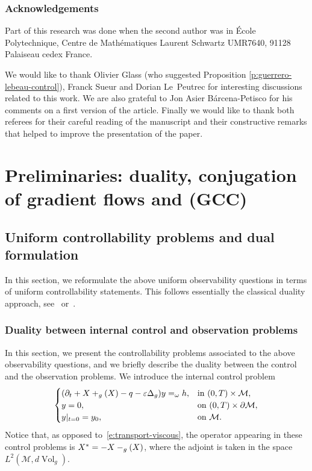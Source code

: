 \documentclass[11pt]{article}
\makeatletter
\numberwithin{equation}{section}
\newcommand{\pGCC}{\textup{(GCC)}\xspace}
\DeclareRobustCommand{\mathds}[1]{\csname jepbb@#1\endcsname}
\theoremstyle{definition}
\newcommand{\M}{\ensuremath{\mathcal M}}
\DeclareMathOperator{\Vol}{Vol}
\let \div \relax
\DeclareMathOperator{\div}{div}
\let\d\partial
\let\eps\varepsilon
\let\q q
\makeatother
\begin{document}
\subsubsection*{Acknowledgements}
Part of this research was done when the second author was in École Polytechnique, Centre de Mathématiques Laurent Schwartz UMR7640, 91128 Palaiseau cedex France.

We would like to thank Olivier Glass (who suggested Proposition \ref{p:guerrero-lebeau-control}), Franck Sueur and Dorian Le~Peutrec for interesting discussions related to this work.
We are also grateful to Jon Asier Bárcena-Petisco for his comments on a first version of the article. Finally we would like to thank both referees for their careful reading of the manuscript and their constructive remarks that helped to improve the presentation of the paper.

\section{Preliminaries: duality, conjugation of gradient flows and \pGCC}
\label{s:preliminaires}

\subsection{Uniform controllability problems and dual formulation}

In this section, we reformulate the above uniform observability questions in terms of uniform controllability statements. This follows essentially the classical duality approach, see~\cite{DR:77} or~\cite[Chap.\,2.3]{Cor:book}.

\subsubsection{Duality between internal control and observation problems}
\label{s:obs-cont}
In this section, we present the controllability problems associated to the above observability questions, and we briefly describe the duality between the control and the observation problems.
We introduce the internal control problem
\begin{equation}
\label{e:transport-viscous-control-internal}
\begin{cases}
(\d_t + X + \div_g(X) -\q - \eps \Delta_g ) y = \mathds{1}_\omega h, & \text{in } (0,T)\times \M, \\
y = 0, & \text{on } (0,T)\times \d\M, \\
y|_{t=0} = y_0, & \text{on } \M.
\end{cases}
\end{equation}
Notice that, as opposed to~\eqref{e:transport-viscous}, the operator appearing in these control problems is $X^* = -X - \div_{g}(X)$, where the adjoint is taken in the space $L^2(\M, d\Vol_g)$.
\end{document}
